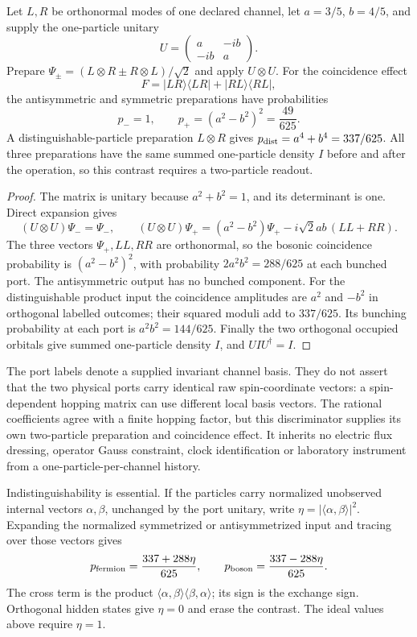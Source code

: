 \begin{proposition}
\label{prop:two-particle-port-discriminator}
Let $L,R$ be orthonormal modes of one declared channel, let
$a=3/5$, $b=4/5$, and supply the one-particle unitary
\[
 U=\begin{pmatrix}a&-ib\\-ib&a\end{pmatrix}.
\]
Prepare $\Psi_\pm=(L\otimes R\pm R\otimes L)/\sqrt2$ and apply
$U\otimes U$. For the coincidence effect
\[
 F=|LR\rangle\langle LR|+|RL\rangle\langle RL|,
\]
the antisymmetric and symmetric preparations have probabilities
\[
 p_-=1,\qquad p_+=(a^2-b^2)^2=\frac{49}{625}.
\]
A distinguishable-particle preparation $L\otimes R$ gives
$p_{\rm dist}=a^4+b^4=337/625$. All three preparations have the same
summed one-particle density $I$ before and after the operation, so this
contrast requires a two-particle readout.
\end{proposition}
\begin{proof}
The matrix is unitary because $a^2+b^2=1$, and its determinant is one.
Direct expansion gives
\[
 (U\otimes U)\Psi_-=\Psi_-,\qquad
 (U\otimes U)\Psi_+
  =(a^2-b^2)\Psi_+-i\sqrt2 ab\,(LL+RR).
\]
The three vectors $\Psi_+,LL,RR$ are orthonormal, so the bosonic
coincidence probability is $(a^2-b^2)^2$, with probability
$2a^2b^2=288/625$ at each bunched port. The antisymmetric output has no
bunched component. For the distinguishable product input the coincidence
amplitudes are $a^2$ and $-b^2$ in orthogonal labelled outcomes; their
squared moduli add to $337/625$. Its bunching probability at each port is
$a^2b^2=144/625$. Finally the two orthogonal occupied orbitals give summed
one-particle density $I$, and $UIU^\dagger=I$.
\end{proof}

The port labels denote a supplied invariant channel basis. They do not
assert that the two physical ports carry identical raw spin-coordinate
vectors: a spin-dependent hopping matrix can use different local basis
vectors. The rational coefficients agree with a finite hopping factor,
but this discriminator supplies its own two-particle preparation and
coincidence effect. It inherits no electric flux dressing, operator Gauss
constraint, clock identification or laboratory instrument from a
one-particle-per-channel history.

Indistinguishability is essential. If the particles carry normalized
unobserved internal vectors $\alpha,\beta$, unchanged by the port unitary,
write $\eta=|\langle\alpha,\beta\rangle|^2$. Expanding the normalized
symmetrized or antisymmetrized input and tracing over those vectors gives
\[
 p_{\rm fermion}=\frac{337+288\eta}{625},\qquad
 p_{\rm boson}=\frac{337-288\eta}{625}.
\]
The cross term is the product
$\langle\alpha,\beta\rangle\langle\beta,\alpha\rangle$; its sign is
the exchange sign. Orthogonal hidden states give $\eta=0$ and erase the
contrast. The ideal values above require $\eta=1$.

